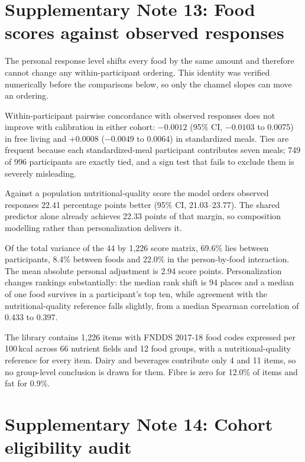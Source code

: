 \documentclass[10pt]{article}
\begin{document}




\clearpage

\section*{Supplementary Note 13: Food scores against observed responses}

The personal response level shifts every food by the same amount and therefore cannot change any
within-participant ordering. This identity was verified numerically before the comparisons below,
so only the channel slopes can move an ordering.

Within-participant pairwise concordance with observed responses does not improve with calibration
in either cohort: $-0.0012$ (95\% CI, $-0.0103$ to 0.0075) in free living and $+0.0008$
($-0.0049$ to 0.0064) in standardized meals. Ties are frequent because each standardized-meal
participant contributes seven meals; 749 of 996 participants are exactly tied, and a sign test
that fails to exclude them is severely misleading.

Against a population nutritional-quality score the model orders observed responses 22.41
percentage points better (95\% CI, 21.03--23.77). The shared predictor alone already achieves
22.33 points of that margin, so composition modelling rather than personalization delivers it.

Of the total variance of the 44 by 1{,}226 score matrix, 69.6\% lies between participants, 8.4\%
between foods and 22.0\% in the person-by-food interaction. The mean absolute personal adjustment
is 2.94 score points. Personalization changes rankings substantially: the median rank shift is 94
places and a median of one food survives in a participant's top ten, while agreement with the
nutritional-quality reference falls slightly, from a median Spearman correlation of 0.433 to 0.397.

The library contains 1{,}226 items with FNDDS 2017-18 food codes expressed per 100\,kcal across 66
nutrient fields and 12 food groups, with a nutritional-quality reference for every item. Dairy and
beverages contribute only 4 and 11 items, so no group-level conclusion is drawn for them. Fibre is
zero for 12.0\% of items and fat for 0.9\%.




\clearpage

\section*{Supplementary Note 14: Cohort eligibility audit}
\end{document}
